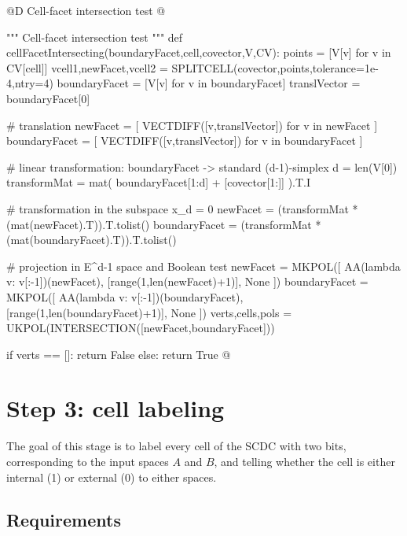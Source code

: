 \documentclass[11pt,oneside]{article}	%
\begin{document}
@D Cell-facet intersection test
@{""" Cell-facet intersection test """
def cellFacetIntersecting(boundaryFacet,cell,covector,V,CV):
	points = [V[v] for v in CV[cell]]
	vcell1,newFacet,vcell2 = SPLITCELL(covector,points,tolerance=1e-4,ntry=4)
	boundaryFacet = [V[v] for v in boundaryFacet]
	translVector = boundaryFacet[0]
	
	# translation 
	newFacet = [ VECTDIFF([v,translVector]) for v in newFacet ]
	boundaryFacet = [ VECTDIFF([v,translVector]) for v in boundaryFacet ]
	
	# linear transformation: boundaryFacet -> standard (d-1)-simplex
	d = len(V[0])
	transformMat = mat( boundaryFacet[1:d] + [covector[1:]] ).T.I
	
	# transformation in the subspace x_d = 0
	newFacet = (transformMat * (mat(newFacet).T)).T.tolist()
	boundaryFacet = (transformMat * (mat(boundaryFacet).T)).T.tolist()
	
	# projection in E^{d-1} space and Boolean test
	newFacet = MKPOL([ AA(lambda v: v[:-1])(newFacet), 
							[range(1,len(newFacet)+1)], None ])
	boundaryFacet = MKPOL([ AA(lambda v: v[:-1])(boundaryFacet), 
							[range(1,len(boundaryFacet)+1)], None ])
	verts,cells,pols = UKPOL(INTERSECTION([newFacet,boundaryFacet]))
	
	if verts == []: return False
	else: return True
@}








\section{Step 3: cell labeling}

The goal of this stage is to label every cell of the SCDC with two bits, corresponding to the input spaces $A$ and $B$, and telling whether the cell is either internal (1) or external (0) to either spaces.

\subsection{Requirements}
\end{document}
